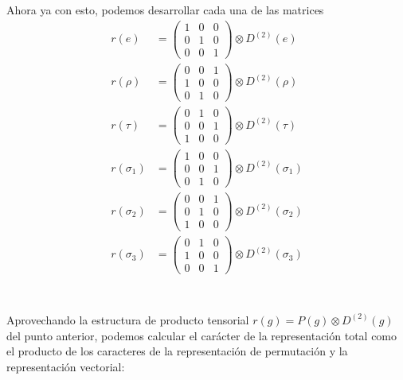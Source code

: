 \documentclass[12pt]{amsart}
\begin{document}
  Ahora ya con esto, podemos desarrollar cada una de las matrices
  \begin{align*}
    r(e) &=
    \begin{pmatrix}
      1 & 0 & 0\\
      0 & 1 & 0\\
      0 & 0 & 1
    \end{pmatrix} \otimes D^{(2)}(e)\\
    r(\rho) &=
    \begin{pmatrix}
      0 & 0 & 1\\
      1 & 0 & 0\\
      0 & 1 & 0
    \end{pmatrix} \otimes D^{(2)}(\rho)\\
    r(\tau) &=
    \begin{pmatrix}
      0 & 1 & 0\\
      0 & 0 & 1\\
      1 & 0 & 0
    \end{pmatrix} \otimes D^{(2)}(\tau)\\
    r(\sigma_1) &=
    \begin{pmatrix}
      1 & 0 & 0\\
      0 & 0 & 1\\
      0 & 1 & 0
    \end{pmatrix} \otimes D^{(2)}(\sigma_1)\\
    r(\sigma_2) &=
    \begin{pmatrix}
      0 & 0 & 1\\
      0 & 1 & 0\\
      1 & 0 & 0
    \end{pmatrix} \otimes D^{(2)}(\sigma_2)\\
    r(\sigma_3) &=
    \begin{pmatrix}
      0 & 1 & 0\\
      1 & 0 & 0\\
      0 & 0 & 1
    \end{pmatrix} \otimes D^{(2)}(\sigma_3)\\
  \end{align*}

  \section{}

Aprovechando la estructura de producto tensorial $r(g) = P(g) \otimes D^{(2)}(g)$ del punto anterior, podemos calcular el carácter de la representación total como el producto de los caracteres de la representación de permutación y la representación vectorial:
\end{document}
